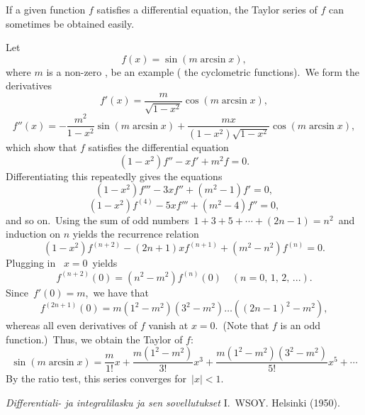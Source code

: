 \documentclass[12pt]{article}
\begin{document}
If a given function $f$ satisfies a  differential equation, the Taylor series  of $f$ can sometimes be obtained easily.

Let 
               $$f(x) = \sin(m\arcsin x),$$
where $m$ is a non-zero , be an example ( the cyclometric functions).\, We form the derivatives
          $$f'(x) = \frac{m}{\sqrt{1-x^2}}\cos(m\arcsin x),$$
            $$f''(x) = -\frac{m^2}{1-x^2}\sin(m\arcsin x)
                  +\frac{mx}{(1-x^2)\sqrt{1-x^2}}\cos(m\arcsin x),$$
which show that $f$ satisfies the differential equation
            $$(1-x^2)f''-xf'+m^2f = 0.$$
Differentiating this repeatedly gives the equations
            $$(1-x^2)f'''-3xf''+(m^2-1)f' = 0,$$
            $$(1-x^2)f^{(4)}-5xf'''+(m^2-4)f'' = 0,$$
and so on.\, Using the sum of odd numbers\, $1+3+5+\cdots+(2n\!-\!1) = n^2$\, and induction on $n$ yields the recurrence relation
    $$(1-x^2)f^{(n+2)}-(2n+1)xf^{(n+1)}+(m^2-n^2)f^{(n)} = 0.$$
Plugging in \, $x = 0$\, yields
     $$f^{(n+2)}(0) = (n^2-m^2)f^{(n)}(0) \quad (n = 0,\,1,\,2,\,...).$$
Since\, $f'(0) = m$,\, we have that
     $$f^{(2n+1)}(0) = m(1^2-m^2)(3^2-m^2)\ldots((2n-1)^2-m^2),$$
whereas all even derivatives of $f$ vanish at $x=0$.\, (Note that $f$ is an odd function.)\, Thus, we obtain the Taylor  of $f$:
$$\sin(m\arcsin x) = \frac{m}{1!}x+\frac{m(1^2-m^2)}{3!}x^3+
\frac{m(1^2-m^2)(3^2-m^2)}{5!}x^5+\cdots$$
By the ratio test, this series converges for\, $|x| < 1$.

\begin{thebibliography}{8}
 {\em Differentiali- ja integralilasku 
ja sen sovellutukset} I. \,WSOY. Helsinki (1950).
\end{thebibliography}
\end{document}
